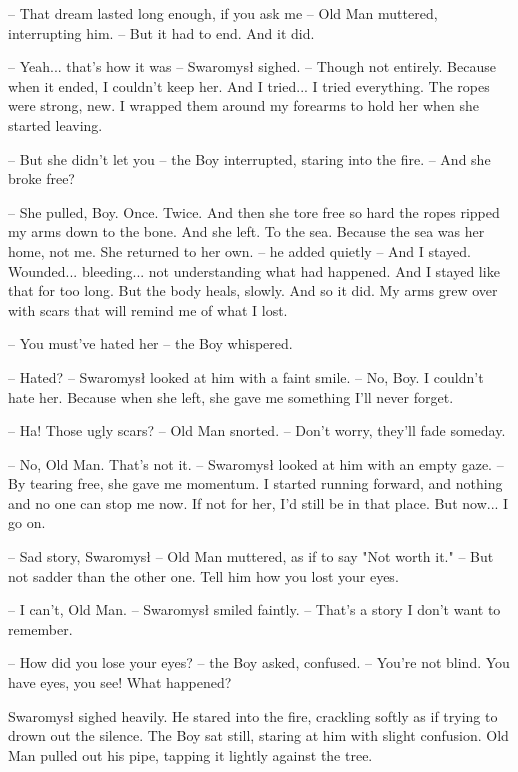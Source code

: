 \par\noindent-- That dream lasted long enough, if you ask me -- Old Man muttered, interrupting him. -- But it had to end. And it did. 
\par\noindent-- Yeah... that's how it was -- Swaromysł sighed. -- Though not entirely. Because when it ended, I couldn't keep her. And I tried... I tried everything. The ropes were strong, new. I wrapped them around my forearms to hold her when she started leaving. 
\par\noindent-- But she didn't let you -- the Boy interrupted, staring into the fire. -- And she broke free? 
\par\noindent-- She pulled, Boy. Once. Twice. And then she tore free so hard the ropes ripped my arms down to the bone. And she left. To the sea. Because the sea was her home, not me. She returned to her own. -- he added quietly -- And I stayed. Wounded... bleeding... not understanding what had happened. And I stayed like that for too long. But the body heals, slowly. And so it did. My arms grew over with scars that will remind me of what I lost. 
\par\noindent-- You must've hated her -- the Boy whispered. 
\par\noindent-- Hated? -- Swaromysł looked at him with a faint smile. -- No, Boy. I couldn't hate her. Because when she left, she gave me something I'll never forget. 
\par\noindent-- Ha! Those ugly scars? -- Old Man snorted. -- Don't worry, they'll fade someday. 
\par\noindent-- No, Old Man. That's not it. -- Swaromysł looked at him with an empty gaze. -- By tearing free, she gave me momentum. I started running forward, and nothing and no one can stop me now. If not for her, I'd still be in that place. But now... I go on. 
\par\noindent-- Sad story, Swaromysł -- Old Man muttered, as if to say "Not worth it." -- But not sadder than the other one. Tell him how you lost your eyes. 
\par\noindent-- I can't, Old Man. -- Swaromysł smiled faintly. -- That's a story I don't want to remember. 
\par\noindent-- How did you lose your eyes? -- the Boy asked, confused. -- You're not blind. You have eyes, you see! What happened? 
\par\indent Swaromysł sighed heavily. He stared into the fire, crackling softly as if trying to drown out the silence. The Boy sat still, staring at him with slight confusion. Old Man pulled out his pipe, tapping it lightly against the tree. 
